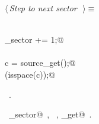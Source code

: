 \documentclass{report}
\begin{document}
\begin{flushleft} \small
\begin{minipage}{\linewidth} \label{scrap35}
$\langle\,${\it Step to next sector}\nobreak\ {\footnotesize {}}$\,\rangle\equiv$
\vspace{-1ex}
\begin{list}{}{} \item
\mbox{}\verb@@\\
\mbox{}\verb@current_sector += 1;@\\
\mbox{}\verb@do@\\
\mbox{}\verb@   c = source_get();@\\
\mbox{}\verb@while (isspace(c));@\\
\mbox{}\verb@@{\NWsep}
\end{list}
\vspace{-1ex}
\footnotesize\addtolength{\baselineskip}{-1ex}
\begin{list}{}{\setlength{\itemsep}{-\parsep}\setlength{\itemindent}{-\leftmargin}}
\item \NWtxtMacroRefIn\ .
\end{list}
\vspace{-2ex}
\footnotesize\addtolength{\baselineskip}{-1ex}
\begin{list}{}{\setlength{\itemsep}{-\parsep}\setlength{\itemindent}{-\leftmargin}}
\item \NWtxtIdentsUsed\nobreak\  \verb@current_sector@\nobreak\ , \verb@isspace@\nobreak\ , \verb@source_get@\nobreak\ .\end{list}
\end{minipage}\\[4ex]
\end{flushleft}
\end{document}
